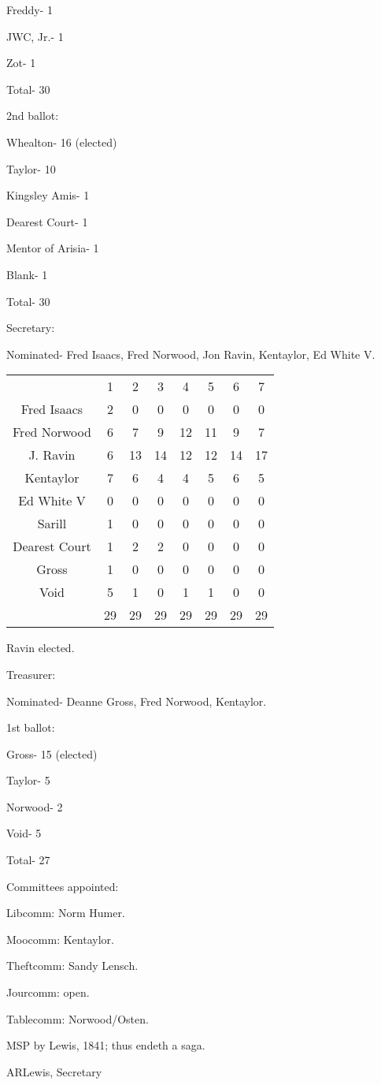 \documentclass[12pt]{article}
\begin{document}
Freddy- 1

JWC, Jr.- 1

Zot- 1

Total- 30

2nd ballot:

Whealton- 16 (elected)

Taylor- 10

Kingsley Amis- 1

Dearest Court- 1

Mentor of Arisia- 1

Blank- 1

Total- 30

Secretary:

Nominated- Fred Isaacs, Fred Norwood, Jon Ravin, Kentaylor, Ed White V.

\begin{center}
\begin{tabular}{ c c c c c c c c }
  & 1 & 2 & 3 & 4 & 5 & 6 & 7 \\ 
 Fred Isaacs & 2 & 0 & 0 & 0 & 0 & 0 & 0 \\
 Fred Norwood & 6 & 7 & 9 & 12 & 11 & 9 & 7 \\
 J. Ravin & 6 & 13 & 14 & 12 & 12 & 14 & 17 \\
 Kentaylor & 7 & 6 & 4 & 4 & 5 & 6 & 5 \\
 Ed White V & 0 & 0 & 0 & 0 & 0 & 0 & 0 \\
 Sarill & 1 & 0 & 0 & 0 & 0 & 0 & 0 \\
 Dearest Court & 1 & 2 & 2 & 0 & 0 & 0 & 0 \\
 Gross & 1 & 0 & 0 & 0 & 0 & 0 & 0 \\
 Void & 5 & 1 & 0 & 1 & 1 & 0 & 0 \\
  & 29 & 29 & 29 & 29 & 29 & 29 & 29 \\ 
\end{tabular}
\end{center}

Ravin elected.

Treasurer:

Nominated- Deanne Gross, Fred Norwood, Kentaylor.

1st ballot:

Gross- 15 (elected)

Taylor- 5

Norwood- 2

Void- 5

Total- 27

Committees appointed:

Libcomm: Norm Humer.

Moocomm: Kentaylor.

Theftcomm: Sandy Lensch.

Jourcomm: open.

Tablecomm: Norwood/Osten.

MSP by Lewis, 1841; thus endeth a saga.

\vspace{12pt}

\centerline{ARLewis, Secretary}
\end{document}
